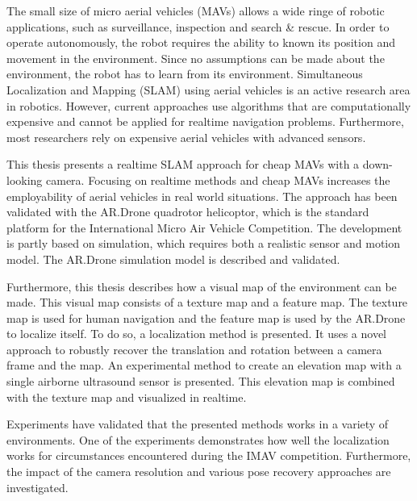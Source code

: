 The small size of micro aerial vehicles (MAVs) allows a wide ringe of robotic applications, such as surveillance, inspection and search \& rescue.
In order to operate autonomously, the robot requires the ability to known its position and movement in the environment.
Since no assumptions can be made about the environment, the robot has to learn from its environment.
Simultaneous Localization and Mapping (SLAM) using aerial vehicles is an active research area in robotics.
However, current approaches use algorithms that are computationally expensive and cannot be applied for realtime navigation problems.
Furthermore, most researchers rely on expensive aerial vehicles with advanced sensors.

This thesis presents a realtime SLAM approach for cheap MAVs with a down-looking camera.
Focusing on realtime methods and cheap MAVs increases the employability of aerial vehicles in  real world situations.
The approach has been validated with the AR.Drone quadrotor helicoptor, which is the standard platform for the International Micro Air Vehicle Competition.
The development is partly based on simulation, which requires both a realistic sensor and motion model.
The AR.Drone simulation model is described and validated.

Furthermore, this thesis describes how a visual map of the environment can be made.
This visual map consists of a texture map and a feature map. The texture map is used for human navigation and the feature map is used by the AR.Drone to localize itself.
To do so, a localization method is presented.
It uses a novel approach to robustly recover the translation and rotation between a camera frame and the map.
An experimental method to create an elevation map with a single airborne ultrasound sensor is presented.
This elevation map is combined with the texture map and visualized in realtime.

Experiments have validated that the presented methods works in a variety of environments.
One of the experiments demonstrates how well the localization works for circumstances encountered during the IMAV competition. 
Furthermore, the impact of the camera resolution and various pose recovery approaches are investigated.





\begin{comment}
Extensive experiments have validated that the approach works in a vast variety of environments. It has been shown that a visual compass can supply a mobile robot in natural environments with accurate heading estimates. Finally, it is shown in experiments that a robot using multiple compasses is able to estimate its translational pose.
\end{comment}

